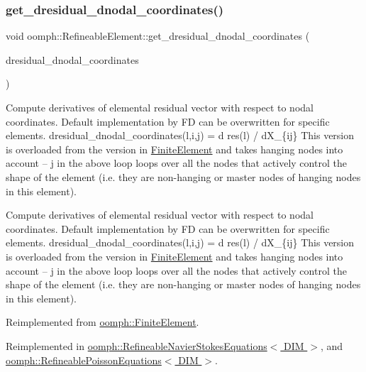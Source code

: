 \subsubsection{\texorpdfstring{get\+\_\+dresidual\+\_\+dnodal\+\_\+coordinates()}{get\_dresidual\_dnodal\_coordinates()}}
{\footnotesize\ttfamily void oomph\+::\+Refineable\+Element\+::get\+\_\+dresidual\+\_\+dnodal\+\_\+coordinates (\begin{DoxyParamCaption}\item[{\hyperlink{classoomph_1_1RankThreeTensor}{Rank\+Three\+Tensor}$<$ double $>$ \&}]{dresidual\+\_\+dnodal\+\_\+coordinates }\end{DoxyParamCaption})\hspace{0.3cm}{\ttfamily [virtual]}}



Compute derivatives of elemental residual vector with respect to nodal coordinates. Default implementation by FD can be overwritten for specific elements. dresidual\+\_\+dnodal\+\_\+coordinates(l,i,j) = d res(l) / d\+X\+\_\+\{ij\} This version is overloaded from the version in \hyperlink{classoomph_1_1FiniteElement}{Finite\+Element} and takes hanging nodes into account -- j in the above loop loops over all the nodes that actively control the shape of the element (i.\+e. they are non-\/hanging or master nodes of hanging nodes in this element). 

Compute derivatives of elemental residual vector with respect to nodal coordinates. Default implementation by FD can be overwritten for specific elements. dresidual\+\_\+dnodal\+\_\+coordinates(l,i,j) = d res(l) / d\+X\+\_\+\{ij\} This version is overloaded from the version in \hyperlink{classoomph_1_1FiniteElement}{Finite\+Element} and takes hanging nodes into account -- j in the above loop loops over all the nodes that actively control the shape of the element (i.\+e. they are non-\/hanging or master nodes of hanging nodes in this element). 

Reimplemented from \hyperlink{classoomph_1_1FiniteElement_ae4b85a31a983a52d3010930f9e0851b8}{oomph\+::\+Finite\+Element}.



Reimplemented in \hyperlink{classoomph_1_1RefineableNavierStokesEquations_ac88134acd65f21845e5fc8e83b89c74a}{oomph\+::\+Refineable\+Navier\+Stokes\+Equations$<$ D\+I\+M $>$}, and \hyperlink{classoomph_1_1RefineablePoissonEquations_a1cb1cf52a2332954f69199c7e0c219b4}{oomph\+::\+Refineable\+Poisson\+Equations$<$ D\+I\+M $>$}.



